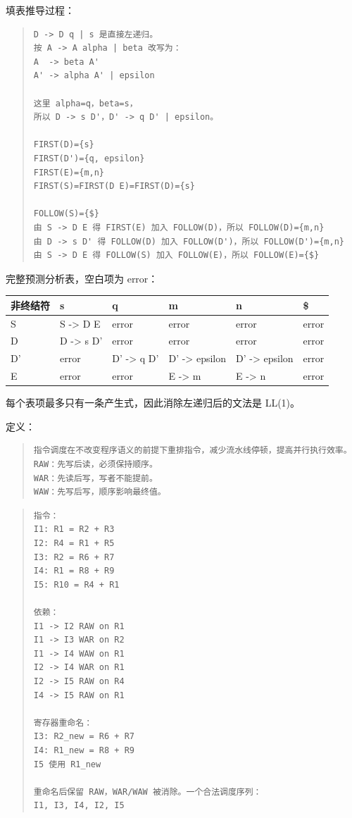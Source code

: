 \documentclass[UTF8,zihao=-4]{ctexart}
\newcommand{\answerquestion}[2]{\par\vspace{0.75em}\noindent{\large\bfseries 题目 #1 #2}\par\vspace{0.35em}}
\begin{document}
填表推导过程：

\begin{quote}
\footnotesize
\begin{verbatim}
D -> D q | s 是直接左递归。
按 A -> A alpha | beta 改写为：
A  -> beta A'
A' -> alpha A' | epsilon

这里 alpha=q，beta=s，
所以 D -> s D'，D' -> q D' | epsilon。

FIRST(D)={s}
FIRST(D')={q, epsilon}
FIRST(E)={m,n}
FIRST(S)=FIRST(D E)=FIRST(D)={s}

FOLLOW(S)={$}
由 S -> D E 得 FIRST(E) 加入 FOLLOW(D)，所以 FOLLOW(D)={m,n}
由 D -> s D' 得 FOLLOW(D) 加入 FOLLOW(D')，所以 FOLLOW(D')={m,n}
由 S -> D E 得 FOLLOW(S) 加入 FOLLOW(E)，所以 FOLLOW(E)={$}
\end{verbatim}
\end{quote}

完整预测分析表，空白项为 error：

\begin{center}
\footnotesize
\begin{tabular}{llllll}
\hline
非终结符 & s & q & m & n & \$ \\
\hline
S & S -> D E & error & error & error & error \\
D & D -> s D' & error & error & error & error \\
D' & error & D' -> q D' & D' -> epsilon & D' -> epsilon & error \\
E & error & error & E -> m & E -> n & error \\
\hline
\end{tabular}
\end{center}

每个表项最多只有一条产生式，因此消除左递归后的文法是 LL(1)。



\answerquestion{3}{指令调度答案}


定义：


\begin{quote}
\footnotesize
\begin{verbatim}
指令调度在不改变程序语义的前提下重排指令，减少流水线停顿，提高并行执行效率。
RAW：先写后读，必须保持顺序。
WAR：先读后写，写者不能提前。
WAW：先写后写，顺序影响最终值。
\end{verbatim}
\end{quote}


\begin{quote}
\footnotesize
\begin{verbatim}
指令：
I1: R1 = R2 + R3
I2: R4 = R1 + R5
I3: R2 = R6 + R7
I4: R1 = R8 + R9
I5: R10 = R4 + R1

依赖：
I1 -> I2 RAW on R1
I1 -> I3 WAR on R2
I1 -> I4 WAW on R1
I2 -> I4 WAR on R1
I2 -> I5 RAW on R4
I4 -> I5 RAW on R1

寄存器重命名：
I3: R2_new = R6 + R7
I4: R1_new = R8 + R9
I5 使用 R1_new

重命名后保留 RAW，WAR/WAW 被消除。一个合法调度序列：
I1, I3, I4, I2, I5
\end{verbatim}
\end{quote}
\end{document}
